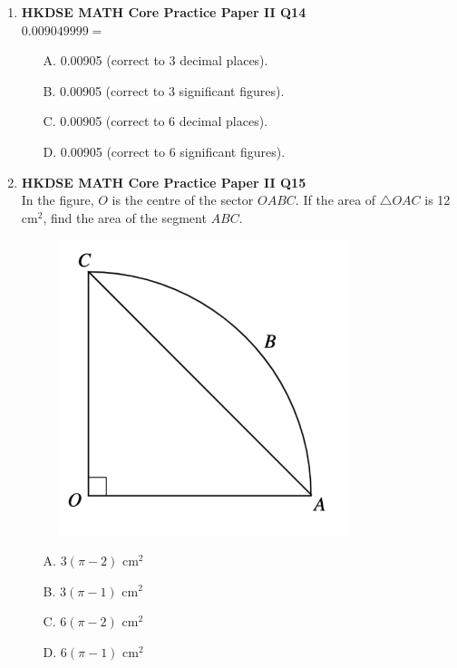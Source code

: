 \documentclass[12pt]{article}
\begin{document}
\begin{enumerate}
	\item \textbf{HKDSE MATH Core Practice Paper II Q14}\\
	$0.009049999 =$
	\begin{enumerate}
		\item[A.] 0.00905 (correct to 3 decimal places).
		\item[B.] 0.00905 (correct to 3 significant figures).
		\item[C.] 0.00905 (correct to 6 decimal places).
		\item[D.] 0.00905 (correct to 6 significant figures).
	\end{enumerate}

	\item \textbf{HKDSE MATH Core Practice Paper II Q15}\\
	In the figure, $O$ is the centre of the sector $OABC$. If the area of $\triangle OAC$ is 12 cm$^2$, find the area of the segment $ABC$.
	\begin{figure}[H]
		\centering
		\includegraphics[width = 0.8\textwidth]{PPFigure2.15}
	\end{figure}
	\begin{enumerate}
		\item[A.] $3(\pi - 2)$ cm$^2$
		\item[B.] $3(\pi - 1)$ cm$^2$
		\item[C.] $6(\pi - 2)$ cm$^2$
		\item[D.] $6(\pi - 1)$ cm$^2$
	\end{enumerate}


\end{enumerate}
\end{document}
